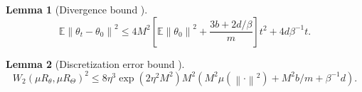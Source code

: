 \documentclass{article}
\newcommand{\norm}[1]{\left\lVert#1\right\rVert} %
\newtheorem{lemma}{Lemma}
\begin{document}
\begin{lemma}[Divergence bound {\citep[Lemma B.3]{Farghly}}]
$$\mathbb{E} \norm{\theta_t - \theta_0}^2 \leq 4M^2 \left[\mathbb{E}\norm{\theta_0}^2 + \frac{3b + 2d/\beta}{m}\right] t^2 + 4d\beta^{-1} t.$$
\end{lemma}

\begin{lemma}[Discretization error bound {\citep[Lemma B.4]{Farghly}}]
    $$W_2(\mu R_\theta, \mu R_\Theta)^2 \leq 8 \eta^3  \exp \left( 2 \eta^2 M^2 \right) M^2 ( M^2   \mu(\norm{\cdot}^2) + M^2 b/m + \beta^{-1} d ).$$
\end{lemma}
\end{document}
